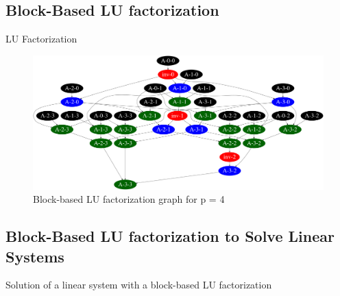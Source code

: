 \subsection{Block-Based LU factorization}

\begin{algorithm}[h]
	\DontPrintSemicolon
	\caption{LU Factorization\label{alg:lufact_data_dep}}
\end{algorithm}

\begin{figure}[h]
	\centering
	\includegraphics[width=\textwidth]{lu_graph_n4}
	\caption{Block-based LU factorization graph for p = 4\label{fig:graph_lu}}
\end{figure}

\subsection{Block-Based LU factorization to Solve Linear Systems}


\begin{algorithm}[h]
	\DontPrintSemicolon
	\caption{Solution of a linear system with a block-based LU factorization\label{alg:lufact_sls_data_dep}}
	\;
\end{algorithm}


